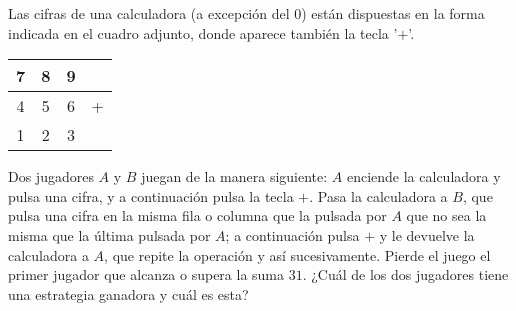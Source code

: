  Las cifras de una calculadora (a excepción del $0$) están dispuestas en la forma indicada en el cuadro adjunto, donde aparece también la tecla '$+$'.
    \begin{center}
    \begin{tabular}{|c|c|c|c|}
        \hline
        7&8&9&\\
        \hline
        4&5&6&+\\
        \hline
        1&2&3&\\
        \hline
    \end{tabular}
    \end{center}
    Dos jugadores $A$ y $B$ juegan de la manera siguiente: $A$ enciende la calculadora y pulsa una cifra, y a continuación pulsa la tecla $+$. Pasa la calculadora a $B$, que pulsa una cifra en la misma fila o columna que la pulsada por $A$ que no sea la misma que la última pulsada por $A$; a continuación pulsa $+$ y le devuelve la calculadora a $A$, que repite la operación y así sucesivamente. Pierde el juego el primer jugador que alcanza o supera la suma $31$. ¿Cuál de los dos jugadores tiene una estrategia ganadora y cuál es esta?
